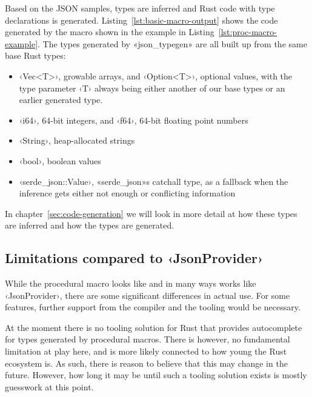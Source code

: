 Based on the JSON samples, types are inferred and Rust code with type declarations is generated. Listing~\ref{lst:basic-macro-output} shows the code generated by the macro shown in the example in Listing~\ref{lst:proc-macro-example}. The types generated by «json_typegen» are all built up from the same base Rust types:

\begin{itemize}
  \item ‹Vec<T>›, growable arrays, and ‹Option<T>›, optional values, with the type parameter ‹T› always being either another of our base types or an earlier generated type.
  \item ‹i64›, 64-bit integers, and ‹f64›, 64-bit floating point numbers
  \item ‹String›, heap-allocated strings
  \item ‹bool›, boolean values
  \item ‹serde_json::Value›, «serde_json»s catchall type, as a fallback when the inference gets either not enough or conflicting information
\end{itemize}

In chapter~\ref{sec:code-generation} we will look in more detail at how these types are inferred and how the types are generated.

\subsection{Limitations compared to ‹JsonProvider›}
\label{sec:macro-limitations}

While the procedural macro looks like and in many ways works like ‹JsonProvider›, there are some significant differences in actual use. For some features, further support from the compiler and the tooling would be necessary.

At the moment there is no tooling solution for Rust that provides autocomplete for types generated by procedural macros. There is however, no fundamental limitation at play here, and is more likely connected to how young the Rust ecosystem is. As such, there is reason to believe that this may change in the future. However, how long it may be until such a tooling solution exists is mostly guesswork at this point.


